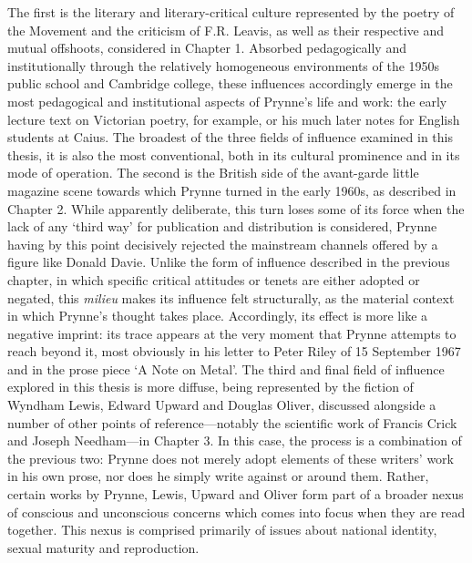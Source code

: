 \documentclass[]{article}
\begin{document}
The first is the literary and literary-critical culture represented by
the poetry of the Movement and the criticism of F.R. Leavis, as well as
their respective and mutual offshoots, considered in Chapter 1. Absorbed
pedagogically and institutionally through the relatively homogeneous
environments of the 1950s public school and Cambridge college, these
influences accordingly emerge in the most pedagogical and institutional
aspects of Prynne’s life and work: the early lecture text on Victorian
poetry, for example, or his much later notes for English students at
Caius. The broadest of the three fields of influence examined in this
thesis, it is also the most conventional, both in its cultural
prominence and in its mode of operation. The second is the British side
of the avant-garde little magazine scene towards which Prynne turned in
the early 1960s, as described in Chapter 2. While apparently deliberate,
this turn loses some of its force when the lack of any ‘third way’ for
publication and distribution is considered, Prynne having by this point
decisively rejected the mainstream channels offered by a figure like
Donald Davie. Unlike the form of influence described in the previous
chapter, in which specific critical attitudes or tenets are either
adopted or negated, this \emph{milieu} makes its influence felt
structurally, as the material context in which Prynne’s thought takes
place. Accordingly, its effect is more like a negative imprint: its
trace appears at the very moment that Prynne attempts to reach beyond
it, most obviously in his letter to Peter Riley of 15 September 1967 and
in the prose piece ‘A Note on Metal’. The third and final field of
influence explored in this thesis is more diffuse, being represented by
the fiction of Wyndham Lewis, Edward Upward and Douglas Oliver,
discussed alongside a number of other points of reference—notably the
scientific work of Francis Crick and Joseph Needham—in Chapter 3. In
this case, the process is a combination of the previous two: Prynne does
not merely adopt elements of these writers’ work in his own prose, nor
does he simply write against or around them. Rather, certain works by
Prynne, Lewis, Upward and Oliver form part of a broader nexus of
conscious and unconscious concerns which comes into focus when they are
read together. This nexus is comprised primarily of issues about
national identity, sexual maturity and reproduction.
\end{document}
